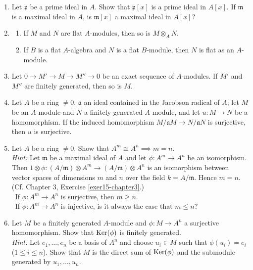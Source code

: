 \begin{enumerate}
    \item \label{exer7-chapter2}Let $\mathfrak{p}$ be a prime ideal in $A$. Show that $\mathfrak{p}[x]$ is a prime ideal in $A[x]$. If $\mathfrak{m}$ is a maximal ideal in $A$, is $\mathfrak{m}[x]$ a maximal ideal in $A[x]$?

    \item \label{exer8-chapter2}\begin{enumerate}
        \item If $M$ and $N$ are flat $A$-modules, then so is $M \otimes_A N$.
        \item If $B$ is a flat $A$-algebra and $N$ is a flat $B$-module, then $N$ is flat as an $A$-module.
    \end{enumerate}

    \item \label{exer9-chapter2}Let $0 \to M' \to M \to M'' \to 0$ be an exact sequence of $A$-modules. If $M'$ and $M''$ are finitely generated, then so is $M$.

    \item \label{exer10-chapter2}Let $A$ be a ring $\neq 0$, $\mathfrak{a}$ an ideal contained in the Jacobson radical of $A$; let $M$ be an $A$-module and $N$ a finitely generated $A$-module, and let $u \colon M \to N$ be a homomorphism. If the induced homomorphism $M/\mathfrak{a}M \to N/\mathfrak{a}N$ is surjective, then $u$ is surjective.

    \item \label{exer11-chapter2}Let $A$ be a ring $\neq 0$. Show that $A^m \cong A^n \implies m = n$.\\
    \textit{Hint:} Let $\mathfrak{m}$ be a maximal ideal of $A$ and let $\phi \colon A^m \to A^n$ be an isomorphism. Then $1 \otimes \phi \colon (A/\mathfrak{m}) \otimes A^m \to (A/\mathfrak{m}) \otimes A^n$ is an isomorphism between vector spaces of dimensions $m$ and $n$ over the field $k = A/\mathfrak{m}$. Hence $m = n$. (Cf. Chapter 3, Exercise \ref{exer15-chapter3}.)\\
    \quad\, If $\phi \colon A^m \to A^n$ is surjective, then $m \geq n$.\\
    \quad\, If $\phi \colon A^m \to A^n$ is injective, is it always the case that $m \leq n$?

    \item \label{exer12-chapter2}Let $M$ be a finitely generated $A$-module and $\phi \colon M \to A^n$ a surjective homomorphism. Show that $\operatorname{Ker}(\phi)$ is finitely generated.\\
    \textit{Hint:} Let $e_1, \ldots, e_n$ be a basis of $A^n$ and choose $u_i \in M$ such that $\phi(u_i) = e_i$ ($1 \leq i \leq n$). Show that $M$ is the direct sum of $\operatorname{Ker}(\phi)$ and the submodule generated by $u_1, \ldots, u_n$.


\end{enumerate}
